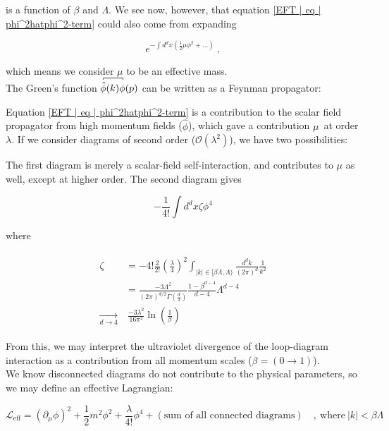 \documentclass[10pt]{report}
\begin{document}
	is a function of $\beta$ and $\Lambda$. We see now, however, that equation \ref{EFT | eq | phi^2hatphi^2-term} could also come from expanding
	
	\begin{equation}
		e^{-\int d^dx \left(\frac{1}{2}\mu\phi^2 + \ldots\right)}\:,
	\end{equation}
	
	which means we consider $\mu$ to be an effective mass.\\
	The Green's function $\contraction[2pt]{}{\hat{\phi}}{(k)}{\phi}\hat{\phi}(k)\phi(p)$ can be written as a Feynman propagator:
	
	Equation \ref{EFT | eq | phi^2hatphi^2-term} is a contribution to the scalar field propagator from high momentum fields ($\hat{\phi}$), which gave a contribution $\mu$ at order $\lambda$.
	If we consider diagrams of second order ($\mathcal{O}(\lambda^2)$), we have two possibilities:
	
	
	The first diagram is merely a scalar-field self-interaction, and contributes to $\mu$ as well, except at higher order. The second diagram gives
	
	\begin{equation}
		-\frac{1}{4!}\int d^dx\zeta\phi^4
	\end{equation}
	
	where
	
	\begin{align}
		\begin{split}
		\zeta &= -4! \frac{2}{2!}\left(\frac{\lambda}{4}\right)^2\int_{|k|\in[\beta\Lambda,\Lambda)}\frac{d^dk}{(2\pi)^d}\frac{1}{k^2} \\
		&= \frac{-3\Lambda^2}{(2\pi)^{d/2}\Gamma\left(\frac{d}{2}\right)}\frac{1-\beta^{d-4}}{d-4}\Lambda^{d-4}\\
		\underset{d\rightarrow4}{\longrightarrow}&\: \frac{-3\lambda^2}{16\pi^2}\ln\left(\frac{1}{\beta}\right)
		\end{split}
	\end{align}
	
	From this, we may interpret the ultraviolet divergence of the loop-diagram interaction as a contribution from all momentum scales ($\beta=(0\rightarrow1)$).\\
	We know disconnected diagrams do not contribute to the physical parameters, so we may define an effective Lagrangian:
	
	\begin{equation}
		\mathcal{L}_{\text{eff}} = \left(\partial_\mu\phi\right)^2 + \frac{1}{2}m^2\phi^2 + \frac{\lambda}{4!}\phi^4 + (\text{sum of all connected diagrams}) \quad,\:\text{where}\: |k|<\beta\Lambda
	\end{equation}
	
\end{document}
